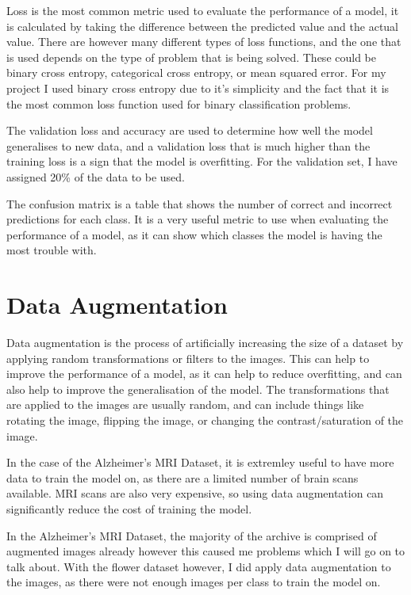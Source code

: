 \documentclass[]{final_report}
\begin{document}
Loss is the most common metric used to evaluate the performance of a model, it is calculated by taking the difference between the predicted value and the actual value.
There are however many different types of loss functions, and the one that is used depends on the type of problem that is being solved.
These could be binary cross entropy, categorical cross entropy, or mean squared error. For my project I used binary cross entropy due
to it's simplicity and the fact that it is the most common loss function used for binary classification problems.

The validation loss and accuracy are used to determine how well the model generalises to new data, and a validation loss that is much higher than the training loss is a sign that the model is overfitting.
For the validation set, I have assigned 20\% of the data to be used.

The confusion matrix is a table that shows the number of correct and incorrect predictions for each class.
It is a very useful metric to use when evaluating the performance of a model, as it can show which classes the model is having the most trouble with.

\section{Data Augmentation}

Data augmentation is the process of artificially increasing the size of a dataset by applying random transformations or filters to the images.
This can help to improve the performance of a model, as it can help to reduce overfitting, and can also help to improve the generalisation of the model.
The transformations that are applied to the images are usually random, and can include things like rotating the image, 
flipping the image, or changing the contrast/saturation of the image.

In the case of the Alzheimer's MRI Dataset, it is extremley useful to have more data to train the model on, as there are a limited number of brain scans available.
MRI scans are also very expensive, so using data augmentation can significantly reduce the cost of training the model.

In the Alzheimer's MRI Dataset, the majority of the archive is comprised of augmented images already however this caused me problems which I will go on to talk about.
With the flower dataset however, I did apply data augmentation to the images, as there were not enough images per class to train the model on.
\end{document}
